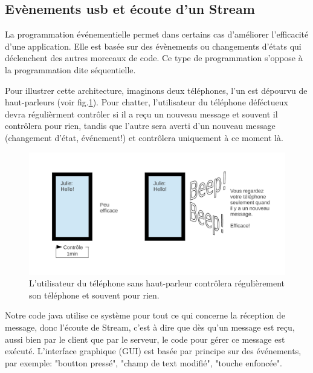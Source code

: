 \documentclass[a4paper,11pt]{report}
\begin{document}
{\subsection{Evènements usb et écoute d'un Stream\label{Event}}

La programmation événementielle permet dans certains cas d'améliorer l'efficacité d'une application. Elle est basée sur des évènements ou changements d'états qui déclenchent des autres morceaux de code. Ce type de programmation s'oppose à la programmation dite séquentielle.

Pour illustrer cette architecture, imaginons deux téléphones, l'un est dépourvu de haut-parleurs (voir fig.\ref{ChatExample}). Pour chatter, l'utilisateur du téléphone déféctueux devra régulièrment contrôler si il a reçu un nouveau message et souvent il contrôlera pour rien, tandis que l'autre sera averti d'un nouveau message (changement d'état, événement!) et contrôlera uniquement à ce moment là.  

\begin{figure}[h]
\includegraphics[width=1.0\textwidth]{figures/EventProgramming1.pdf}
\caption[Analogie à la programmation événementielle]{\label{ChatExample}L'utilisateur du téléphone sans haut-parleur contrôlera régulièrement son téléphone et souvent pour rien.}
\end{figure}

Notre code java utilise ce système pour tout ce qui concerne la réception de message, donc l'écoute de Stream, c'est à dire que dès qu'un message est reçu, aussi bien par le client que par le serveur, le code pour gérer ce message est exécuté. L'interface graphique (GUI) est basée par principe sur des événements, par exemple: "boutton pressé", "champ de text modifié", "touche enfoncée".

}
\end{document}
